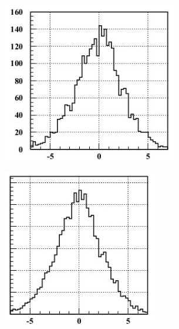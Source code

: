 \begin{figure}
\centering
\begin{subfigure}[b]{0.3\textwidth}
\includegraphics[width=0.84\textwidth]{hist3.jpg}
\end{subfigure}
\begin{subfigure}[b]{0.3\textwidth}
\includegraphics[width=0.75\textwidth]{hist2.jpg}
\end{subfigure}
\begin{subfigure}[b]{0.3\textwidth}

\end{subfigure}
\end{figure}
